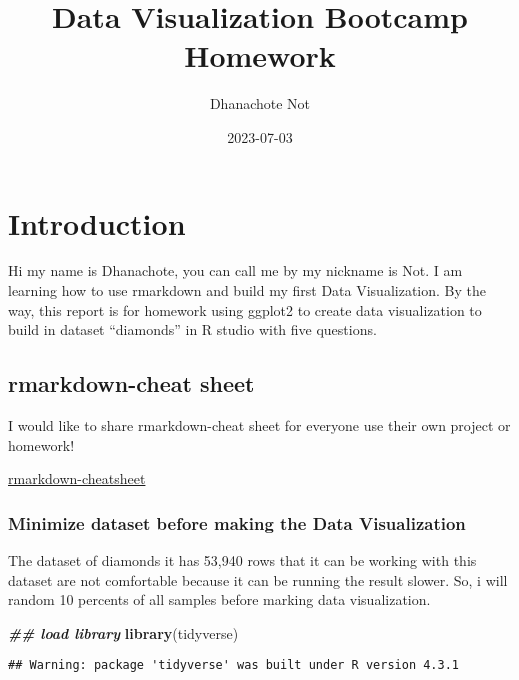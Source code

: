 \documentclass[
]{article}
\title{Data Visualization Bootcamp Homework}
\author{Dhanachote Not}
\date{2023-07-03}
\newenvironment{Shaded}{\begin{snugshade}}{\end{snugshade}}
\newcommand{\DocumentationTok}[1]{\textcolor[rgb]{0.56,0.35,0.01}{\textbf{\textit{#1}}}}
\newcommand{\FunctionTok}[1]{\textcolor[rgb]{0.13,0.29,0.53}{\textbf{#1}}}
\newcommand{\NormalTok}[1]{#1}
\begin{document}
\maketitle

\hypertarget{introduction}{%
\section{Introduction}\label{introduction}}

Hi my name is Dhanachote, you can call me by my nickname is Not. I am
learning how to use rmarkdown and build my first Data Visualization. By
the way, this report is for homework using ggplot2 to create data
visualization to build in dataset ``diamonds'' in R studio with five
questions.

\hypertarget{rmarkdown-cheat-sheet}{%
\subsection{rmarkdown-cheat sheet}\label{rmarkdown-cheat-sheet}}

I would like to share rmarkdown-cheat sheet for everyone use their own
project or homework!

\href{https://www.rstudio.com/wp-content/uploads/2015/02/rmarkdown-cheatsheet.pdf}{rmarkdown-cheatsheet}

\hypertarget{minimize-dataset-before-making-the-data-visualization}{%
\subsubsection{Minimize dataset before making the Data
Visualization}\label{minimize-dataset-before-making-the-data-visualization}}

The dataset of diamonds it has 53,940 rows that it can be working with
this dataset are not comfortable because it can be running the result
slower. So, i will random 10 percents of all samples before marking data
visualization.

\begin{Shaded}
\begin{Highlighting}[]
\DocumentationTok{\#\# load library}
\FunctionTok{library}\NormalTok{(tidyverse)}
\end{Highlighting}
\end{Shaded}

\begin{verbatim}
## Warning: package 'tidyverse' was built under R version 4.3.1
\end{verbatim}
\end{document}
